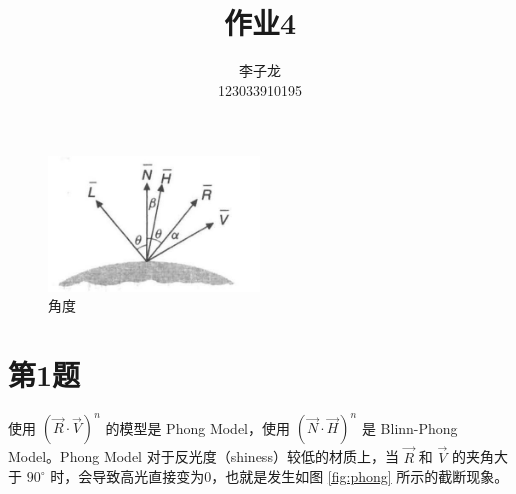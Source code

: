 \documentclass[math-font=newcm]{sjtuarticle}
\title{作业4}
\author{李子龙\\123033910195}
\begin{document}
\maketitle

\tableofcontents*

\begin{figure}[h]
    \centering
    \includegraphics[width=0.5\textwidth]{angles.jpg}
    \caption{角度}
    \label{fig:angles}    
\end{figure}

\section{第1题}

使用 $(\overrightarrow{R}\cdot\overrightarrow{V})^n$ 的模型是 Phong Model，使用 $(\overrightarrow{N}\cdot\overrightarrow{H})^n$ 是 Blinn-Phong Model。Phong Model 对于反光度（shiness）较低的材质上，当 $\overrightarrow{R}$ 和 $\overrightarrow{V}$ 的夹角大于 $90^\circ$ 时，会导致高光直接变为0，也就是发生如图 \ref{fig:phong} 所示的截断现象。
\end{document}
